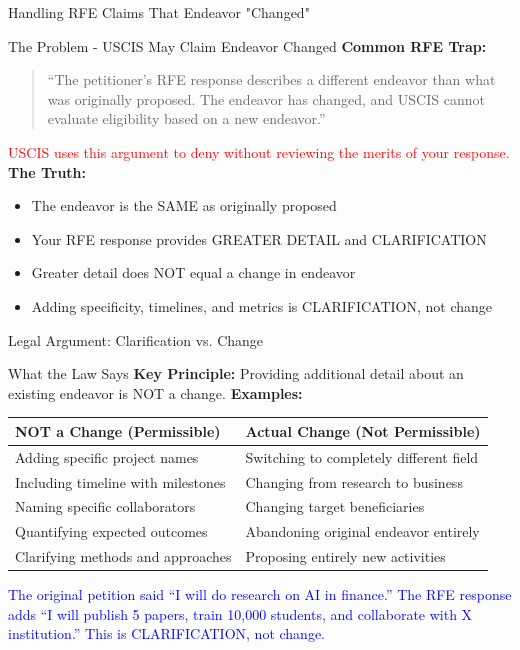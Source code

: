 \documentclass[11pt]{beamer}
\begin{document}
	\begin{frame}{Handling RFE Claims That Endeavor "Changed"}
		\scriptsize
		\begin{block}{The Problem - USCIS May Claim Endeavor Changed}
			\textbf{Common RFE Trap:}
			\begin{quote}
				``The petitioner's RFE response describes a different endeavor than what was originally proposed. The endeavor has changed, and USCIS cannot evaluate eligibility based on a new endeavor.''
			\end{quote}
			\textcolor{red}{USCIS uses this argument to deny without reviewing the merits of your response.}
			\vspace{0.2cm}
			\textbf{The Truth:}
			\begin{itemize}
				\item The endeavor is the SAME as originally proposed
				\item Your RFE response provides GREATER DETAIL and CLARIFICATION
				\item Greater detail does NOT equal a change in endeavor
				\item Adding specificity, timelines, and metrics is CLARIFICATION, not change
			\end{itemize}
		\end{block}
	\end{frame}
	
	\begin{frame}{Legal Argument: Clarification vs. Change}
		\scriptsize
		\begin{block}{What the Law Says}
			\textbf{Key Principle:} Providing additional detail about an existing endeavor is NOT a change.
			\vspace{0.2cm}
			\textbf{Examples:}
			\begin{tabular}{|p{5cm}|p{5cm}|}
				\hline
				\textbf{NOT a Change (Permissible)} & \textbf{Actual Change (Not Permissible)} \\
				\hline
				Adding specific project names & Switching to completely different field \\
				\hline
				Including timeline with milestones & Changing from research to business \\
				\hline
				Naming specific collaborators & Changing target beneficiaries \\
				\hline
				Quantifying expected outcomes & Abandoning original endeavor entirely \\
				\hline
				Clarifying methods and approaches & Proposing entirely new activities \\
				\hline
			\end{tabular}
			\vspace{0.2cm}
			\textcolor{blue}{The original petition said ``I will do research on AI in finance.'' The RFE response adds ``I will publish 5 papers, train 10,000 students, and collaborate with X institution.'' This is CLARIFICATION, not change.}
		\end{block}
	\end{frame}
	
\end{document}
